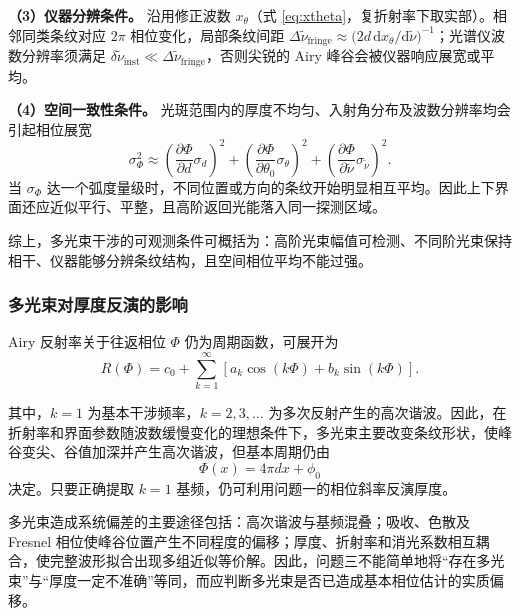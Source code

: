 \documentclass[withoutpreface,bwprint]{cumcmthesis}
\begin{document}
\textbf{（3）仪器分辨条件。}
沿用修正波数 $x_\theta$（式 \eqref{eq:xtheta}，复折射率下取实部）。相邻同类条纹对应 $2\pi$ 相位变化，局部条纹间距 $\Delta\widetilde\nu_{\mathrm{fringe}}\approx\big(2d\,\mathrm d x_\theta/\mathrm d\widetilde\nu\big)^{-1}$；光谱仪波数分辨率须满足 $\delta\widetilde\nu_{\mathrm{inst}}\ll\Delta\widetilde\nu_{\mathrm{fringe}}$，否则尖锐的 Airy 峰谷会被仪器响应展宽或平均。

\textbf{（4）空间一致性条件。}
光斑范围内的厚度不均匀、入射角分布及波数分辨率均会引起相位展宽
\begin{equation}
	\sigma_\Phi^2
	\approx
	\left(\frac{\partial\Phi}{\partial d}\sigma_d\right)^2
	+
	\left(\frac{\partial\Phi}{\partial\theta_0}\sigma_\theta\right)^2
	+
	\left(\frac{\partial\Phi}{\partial\widetilde\nu}\sigma_{\widetilde\nu}\right)^2.
	\label{eq:q3_phase_spread}
\end{equation}
当 $\sigma_\Phi$ 达一个弧度量级时，不同位置或方向的条纹开始明显相互平均。因此上下界面还应近似平行、平整，且高阶返回光能落入同一探测区域。

综上，多光束干涉的可观测条件可概括为：高阶光束幅值可检测、不同阶光束保持相干、仪器能够分辨条纹结构，且空间相位平均不能过强。

\subsubsection{多光束对厚度反演的影响}

Airy 反射率关于往返相位 $\Phi$ 仍为周期函数，可展开为
\begin{equation}
	R(\Phi)
	=
	c_0+
	\sum_{k=1}^{\infty}
	\left[
	a_k\cos(k\Phi)
	+
	b_k\sin(k\Phi)
	\right].
	\label{eq:q3_airy_fourier_expansion}
\end{equation}

其中，$k=1$ 为基本干涉频率，$k=2,3,\ldots$ 为多次反射产生的高次谐波。因此，在折射率和界面参数随波数缓慢变化的理想条件下，多光束主要改变条纹形状，使峰谷变尖、谷值加深并产生高次谐波，但基本周期仍由
\begin{equation}
	\Phi(x)
	=
	4\pi d x+\phi_0
	\label{eq:q3_fundamental_phase_relation}
\end{equation}
决定。只要正确提取 $k=1$ 基频，仍可利用问题一的相位斜率反演厚度。

多光束造成系统偏差的主要途径包括：高次谐波与基频混叠；吸收、色散及 Fresnel 相位使峰谷位置产生不同程度的偏移；厚度、折射率和消光系数相互耦合，使完整波形拟合出现多组近似等价解。因此，问题三不能简单地将“存在多光束”与“厚度一定不准确”等同，而应判断多光束是否已造成基本相位估计的实质偏移。
\end{document}
